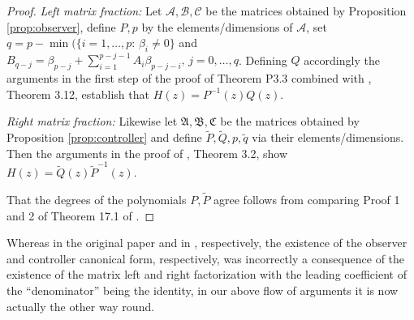 \documentclass[preprint,a4paper,authoryear]{imsart}
\numberwithin{equation}{section}
\theoremstyle{plain}
\theoremstyle{definition}
\theoremstyle{remark}
\begin{document}
\begin{proof}
	\emph{Left matrix fraction:}
Let  $\mathcal{A,B,C}$ be the matrices obtained by Proposition \ref{prop:observer}, define $P,p$ by the elements/dimensions of $\mathcal A$, set $q=p- \min(\{i=1,\ldots,p:\,\beta_i\not =0\}$ and $B_{q-j}=\beta_{p-j}+\sum_{i=1}^{p-j-1}{A_i\beta_{p-j-i}},\,j=0,\ldots,q$. Defining $Q$ accordingly the arguments in the first step of the proof of Theorem P3.3 combined with   \cite{marquardt2007multivariate},  Theorem 3.12, establish that $H(z)=P^{-1}(z)Q(z)$.

	\emph{Right matrix fraction:}
Likewise let  $\mathfrak{A,B,C}$  be the matrices obtained by Proposition \ref{prop:controller}  and define $\widetilde P, \widetilde Q, p, \tilde q$  via their elements/dimensions. Then the arguments in the proof of  \cite{brockwell2011parametric}, Theorem 3.2, show 	$H(z)=\widetilde Q(z) \widetilde P^{-1}(z)$.

That the degrees of the polynomials $P,\widetilde P$ agree follows from comparing Proof 1 and 2 of  Theorem 17.1 of \cite{Brockett2015}.
\end{proof}
Whereas in the original paper and in \cite{brockwell2011parametric}, respectively, the existence of the observer and controller canonical form, respectively, was incorrectly  a consequence of the existence of the matrix left and right factorization with the leading coefficient of the ``denominator'' being the identity, in our above flow of arguments it is now actually the other way round.




\end{document}
